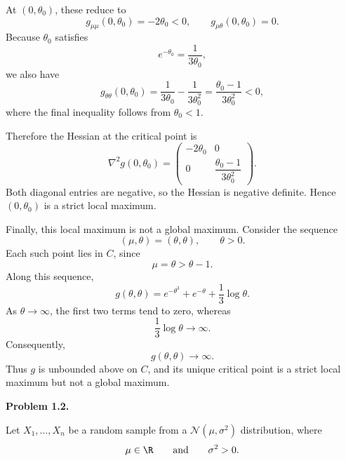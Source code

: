 \documentclass[answers,12pt,addpoints]{exam}
\begin{document}
\begin{questions}
\begin{solution}
At $(0,\theta_0)$, these reduce to
\[
g_{\mu\mu}(0,\theta_0)=-2\theta_0<0,
\qquad
g_{\mu\theta}(0,\theta_0)=0.
\]
Because $\theta_0$ satisfies
\[
e^{-\theta_0}=\frac{1}{3\theta_0},
\]
we also have
\[
g_{\theta\theta}(0,\theta_0)
=
\frac{1}{3\theta_0}
-
\frac{1}{3\theta_0^2}
=
\frac{\theta_0-1}{3\theta_0^2}<0,
\]
where the final inequality follows from $\theta_0<1$.

Therefore the Hessian at the critical point is
\[
\nabla^2g(0,\theta_0)
=
\begin{pmatrix}
-2\theta_0 & 0 \\[4pt]
0 & \dfrac{\theta_0-1}{3\theta_0^2}
\end{pmatrix}.
\]
Both diagonal entries are negative, so the Hessian is negative
definite. Hence $(0,\theta_0)$ is a strict local maximum.

Finally, this local maximum is not a global maximum. Consider
the sequence
\[
(\mu,\theta)=(\theta,\theta),
\qquad \theta>0.
\]
Each such point lies in $C$, since
\[
\mu=\theta>\theta-1.
\]
Along this sequence,
\[
g(\theta,\theta)
=
e^{-\theta^3}
+
e^{-\theta}
+
\frac{1}{3}\log\theta.
\]
As $\theta\to\infty$, the first two terms tend to zero, whereas
\[
\frac{1}{3}\log\theta\to\infty.
\]
Consequently,
\[
g(\theta,\theta)\to\infty.
\]
Thus $g$ is unbounded above on $C$, and its unique critical point
is a strict local maximum but not a global maximum.
\end{solution}

\question[0] \textbf{Problem 1.2.}

Let $X_1,\ldots,X_n$ be a random sample from a
$\mathcal{N}(\mu,\sigma^2)$ distribution, where
\[
\mu\in\R
\qquad\text{and}\qquad
\sigma^2>0.
\]



\end{questions}
\end{document}
